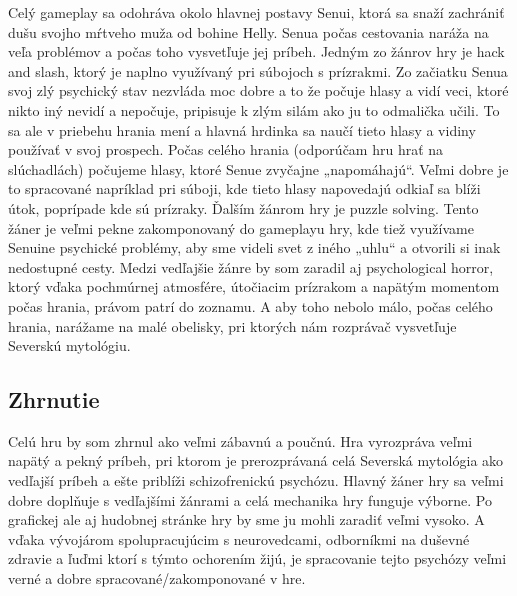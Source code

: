 \documentclass[a4paper,10pt,english]{article}
\begin{document}
Celý gameplay sa odohráva okolo hlavnej postavy Senui, ktorá sa snaží zachrániť dušu svojho mŕtveho muža od bohine Helly. Senua počas cestovania naráža na veľa problémov a počas toho vysvetľuje jej príbeh.  Jedným zo žánrov hry je hack and slash, ktorý je naplno využívaný pri súbojoch s prízrakmi. Zo začiatku Senua svoj zlý psychický stav nezvláda moc dobre a to že počuje hlasy a vidí veci, ktoré nikto iný nevidí a nepočuje, pripisuje k zlým silám ako ju to odmalička učili. To sa ale v priebehu hrania mení a hlavná hrdinka sa naučí tieto hlasy a vidiny používať v svoj prospech. Počas celého hrania (odporúčam hru hrať na slúchadlách) počujeme hlasy, ktoré Senue zvyčajne „napomáhajú“. Veľmi dobre je to spracované napríklad pri súboji, kde tieto hlasy napovedajú odkiaľ sa blíži útok, poprípade kde sú prízraky. Ďalším žánrom hry je puzzle solving. Tento žáner je veľmi pekne zakomponovaný do gameplayu hry, kde tiež využívame Senuine psychické problémy, aby sme videli svet z iného „uhlu“ a otvorili si inak nedostupné cesty. Medzi vedľajšie žánre by som zaradil aj psychological horror, ktorý vďaka pochmúrnej atmosfére, útočiacim prízrakom a napätým momentom počas hrania, právom patrí do zoznamu. A aby toho nebolo málo, počas celého hrania, narážame na malé obelisky, pri ktorých nám rozprávač vysvetľuje Severskú mytológiu.


\subsection*{Zhrnutie}

Celú hru by som zhrnul ako veľmi zábavnú a poučnú. Hra vyrozpráva veľmi napätý a pekný príbeh, pri ktorom je prerozprávaná celá Severská mytológia ako vedľajší príbeh a ešte priblíži schizofrenickú psychózu. Hlavný žáner hry sa veľmi dobre doplňuje s vedľajšími žánrami a celá mechanika hry funguje výborne. Po grafickej ale aj hudobnej stránke hry by sme ju mohli zaradiť veľmi vysoko. A vďaka vývojárom spolupracujúcim s neurovedcami, odborníkmi na duševné zdravie a ľuďmi ktorí s týmto ochorením žijú, je spracovanie tejto psychózy veľmi verné a dobre spracované/zakomponované v hre.
\end{document}
